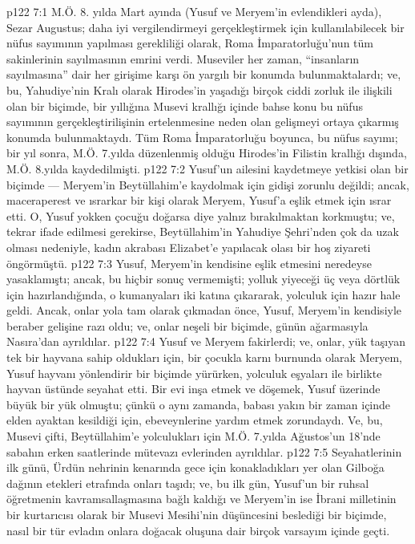 \vs p122 7:1 M.Ö. 8. yılda Mart ayında (Yusuf ve Meryem’in evlendikleri ayda), Sezar Augustus; daha iyi vergilendirmeyi gerçekleştirmek için kullanılabilecek bir nüfus sayımının yapılması gerekliliği olarak, Roma İmparatorluğu’nun tüm sakinlerinin sayılmasının emrini verdi. Museviler her zaman, “insanların sayılmasına” dair her girişime karşı ön yargılı bir konumda bulunmaktalardı; ve, bu, Yahudiye’nin Kralı olarak Hirodes’in yaşadığı birçok ciddi zorluk ile ilişkili olan bir biçimde, bir yıllığına Musevi krallığı içinde bahse konu bu nüfus sayımının gerçekleştirilişinin ertelenmesine neden olan gelişmeyi ortaya çıkarmış konumda bulunmaktaydı. Tüm Roma İmparatorluğu boyunca, bu nüfus sayımı; bir yıl sonra, M.Ö. 7.yılda düzenlenmiş olduğu Hirodes’in Filistin krallığı dışında, M.Ö. 8.yılda kaydedilmişti.
\vs p122 7:2 Yusuf’un ailesini kaydetmeye yetkisi olan bir biçimde --- Meryem’in Beytüllahim’e kaydolmak için gidişi zorunlu değildi; ancak, maceraperest ve ısrarkar bir kişi olarak Meryem, Yusuf’a eşlik etmek için ısrar etti. O, Yusuf yokken çocuğu doğarsa diye yalnız bırakılmaktan korkmuştu; ve, tekrar ifade edilmesi gerekirse, Beytüllahim’in Yahudiye Şehri’nden çok da uzak olması nedeniyle, kadın akrabası Elizabet’e yapılacak olası bir hoş ziyareti öngörmüştü.
\vs p122 7:3 Yusuf, Meryem’in kendisine eşlik etmesini neredeyse yasaklamıştı; ancak, bu hiçbir sonuç vermemişti; yolluk yiyeceği üç veya dörtlük için hazırlandığında, o kumanyaları iki katına çıkararak, yolculuk için hazır hale geldi. Ancak, onlar yola tam olarak çıkmadan önce, Yusuf, Meryem’in kendisiyle beraber gelişine razı oldu; ve, onlar neşeli bir biçimde, günün ağarmasıyla Nasıra’dan ayrıldılar.
\vs p122 7:4 Yusuf ve Meryem fakirlerdi; ve, onlar, yük taşıyan tek bir hayvana sahip oldukları için, bir çocukla karnı burnunda olarak Meryem, Yusuf hayvanı yönlendirir bir biçimde yürürken, yolculuk eşyaları ile birlikte hayvan üstünde seyahat etti. Bir evi inşa etmek ve döşemek, Yusuf üzerinde büyük bir yük olmuştu; çünkü o aynı zamanda, babası yakın bir zaman içinde elden ayaktan kesildiği için, ebeveynlerine yardım etmek zorundaydı. Ve, bu, Musevi çifti, Beytüllahim’e yolculukları için M.Ö. 7.yılda Ağustos’un 18’nde sabahın erken saatlerinde mütevazı evlerinden ayrıldılar.
\vs p122 7:5 Seyahatlerinin ilk günü, Ürdün nehrinin kenarında gece için konakladıkları yer olan Gilboğa dağının etekleri etrafında onları taşıdı; ve, bu ilk gün, Yusuf’un bir ruhsal öğretmenin kavramsallaşmasına bağlı kaldığı ve Meryem’in ise İbrani milletinin bir kurtarıcısı olarak bir Musevi Mesihi’nin düşüncesini beslediği bir biçimde, nasıl bir tür evladın onlara doğacak oluşuna dair birçok varsayım içinde geçti.
